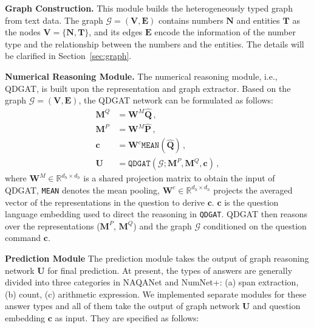 \documentclass{article}
\begin{document}
{\bf Graph Construction.}
This module builds the heterogeneously typed graph from text data. The graph $\mathcal{G}=(\mathbf{V}, \mathbf{E})$ contains numbers $\mathbf{N}$ and entities $\mathbf{T}$ as the nodes $\mathbf{V}=\{\mathbf{N}, \mathbf{T}\}$, and its edges $\mathbf{E}$ encode the information of the number type and the relationship between the numbers and the entities. 
The details will be clarified in Section~\ref{sec:graph}.




{\bf Numerical Reasoning Module.}
The numerical reasoning module, i.e., QDGAT, is built upon the representation and graph extractor.
Based on the graph $\mathcal{G}=(\mathbf{V}, \mathbf{E})$, the QDGAT network can be formulated as follows:
\begin{align}
\mathbf{M}^Q &= \mathbf{W}^M\hat{\mathbf{Q}} \,, \\
\mathbf{M}^P &= \mathbf{W}^M\hat{\mathbf{P}} \,, \\
\mathbf{c} &= \mathbf{W}^c\texttt{MEAN}(\hat{\mathbf{Q}}) \,, \\
\mathbf{U} &= \texttt{QDGAT}(\mathcal{G}; \mathbf{M}^P, \mathbf{M}^Q, \mathbf{c}) \,, \label{equ:qdgat}
\end{align}
where $\mathbf{W}^M \in \mathbb{R}^{d_h\times d_h}$ is a shared projection matrix to obtain the input of QDGAT, \texttt{MEAN} denotes the mean pooling, $\mathbf{W}^c \in \mathbb{R}^{d_h\times d_h}$ projects the averaged vector of the representations in the question to derive $\mathbf{c}$.
$\mathbf{c}$ is the question language embedding used to direct the reasoning in \texttt{QDGAT}.
QDGAT then reasons over the representations ($\mathbf{M}^P$, $\mathbf{M}^Q$) and the graph $\mathcal{G}$ conditioned on the question command $\mathbf{c}$.



{\bf Prediction Module}
The prediction module takes the output of graph reasoning network $\mathbf{U}$ for final prediction.
At present, the types of answers are generally divided into three categories in NAQANet and NumNet+: (a) span extraction, (b) count, (c) arithmetic expression.
We implemented separate modules for these answer types and all of them take the output of graph network $\mathbf{U}$ and question embedding $\mathbf{c}$ as input.
They are specified as follows:
\end{document}
